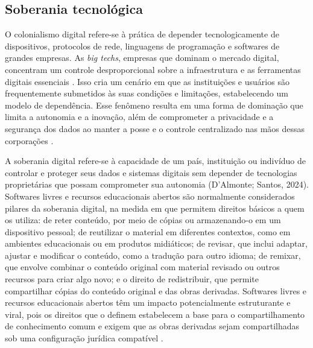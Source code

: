 \documentclass[portuguese]{textolivre}
\begin{document}
\subsection{Soberania tecnológica}

O colonialismo digital refere-se à prática de depender tecnologicamente
de dispositivos, protocolos de rede, linguagens de programação e
softwares de grandes empresas. As \emph{big techs}, empresas que dominam
o mercado digital, concentram um controle desproporcional sobre a
infraestrutura e as ferramentas digitais essenciais \cite{Avelino2021}.
Isso cria um cenário em que as instituições e usuários são
frequentemente submetidos às suas condições e limitações, estabelecendo
um modelo de dependência. Esse fenômeno resulta em uma forma de
dominação que limita a autonomia e a inovação, além de comprometer a
privacidade e a segurança dos dados ao manter a posse e o controle
centralizado nas mãos dessas corporações \cite{Amadeu2021}.

A soberania digital refere-se à capacidade de um país, instituição ou
indivíduo de controlar e proteger seus dados e sistemas digitais sem
depender de tecnologias proprietárias que possam comprometer sua
autonomia (D'Almonte; Santos, 2024). Softwares livres e recursos
educacionais abertos são normalmente considerados pilares da soberania
digital, na medida em que permitem direitos básicos a quem os utiliza:
de reter conteúdo, por meio de cópias ou armazenando-o em um dispositivo
pessoal; de reutilizar o material em diferentes contextos, como em
ambientes educacionais ou em produtos midiáticos; de revisar, que inclui
adaptar, ajustar e modificar o conteúdo, como a tradução para outro
idioma; de remixar, que envolve combinar o conteúdo original com
material revisado ou outros recursos para criar algo novo; e o direito
de redistribuir, que permite compartilhar cópias do conteúdo original e
das obras derivadas. Softwares livres e recursos educacionais abertos
têm um impacto potencialmente estruturante e viral, pois os direitos que
o definem estabelecem a base para o compartilhamento de conhecimento
comum e exigem que as obras derivadas sejam compartilhadas sob uma
configuração jurídica compatível \cite{Benkler2005}.
\end{document}
